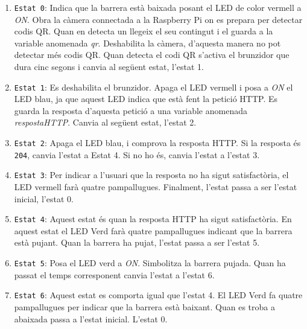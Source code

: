 \begin{enumerate}
    \item \texttt{Estat 0}: Indica que la barrera està baixada posant el LED de color vermell a \emph{ON}.
    Obra la càmera connectada a la Raspberry Pi on es prepara per detectar codis QR.
    Quan en detecta un llegeix el seu contingut i el guarda a la variable anomenada
    \emph{qr}.
    Deshabilita la càmera, d'aquesta manera no pot detectar més codis QR.
    Quan detecta el codi QR s'activa el brunzidor que dura cinc segons i canvia al següent estat, l'estat 1.
    \item \texttt{Estat 1}: Es deshabilita el brunzidor. Apaga el LED vermell i posa a \emph{ON} el LED blau, ja
    que aquest LED indica que està fent la petició HTTP. Es guarda la resposta d'aquesta petició
    a una variable anomenada \emph{respostaHTTP}. Canvia al següent estat, l'estat 2.
    \item \texttt{Estat 2}: Apaga el LED blau, i comprova la resposta HTTP. Si la resposta
    és \texttt{204}, canvia l'estat a Estat 4. Si no ho és, canvia l'estat a l'estat 3.
    \item \texttt{Estat 3}: Per indicar a l'usuari que la resposta no ha sigut
    satisfactòria, el LED vermell farà quatre pampallugues.
    Finalment, l'estat passa a ser l'estat inicial, l'estat 0.
    \item \texttt{Estat 4}: Aquest estat és quan la resposta HTTP ha sigut satisfactòria.
    En aquest estat el LED Verd farà quatre pampallugues indicant que la barrera està pujant.
    Quan la barrera ha pujat, l'estat passa a ser l'estat 5.
    \item \texttt{Estat 5}: Posa el LED verd a \emph{ON}. Simbolitza la barrera pujada.
    Quan ha passat el temps corresponent canvia l'estat a l'estat 6.
    \item \texttt{Estat 6}: Aquest estat es comporta igual que l'estat 4. El LED Verd
    fa quatre pampallugues per indicar que la barrera està baixant.
    Quan es troba a abaixada passa a l'estat inicial. L'estat 0.
\end{enumerate}


